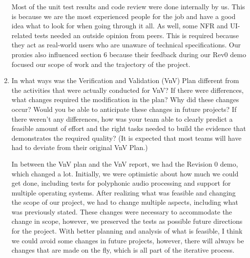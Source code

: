 \documentclass[12pt, titlepage]{article}
\begin{document}
\begin{enumerate}
  Most of the unit test results and code review were done internally by us. This is because we are the most experienced people for the job and 
  have a good idea what to look for when going through it all. As well, some NFR and UI-related tests needed an outside opinion from peers. 
  This is required because they act as real-world users who are unaware of technical specifications. Our proxies also influenced section 6 
  because their feedback during our Rev0 demo focused our scope of work and the trajectory of the project.
  

  \item In what ways was the Verification and Validation (VnV) Plan different
  from the activities that were actually conducted for VnV?  If there were
  differences, what changes required the modification in the plan?  Why did
  these changes occur?  Would you be able to anticipate these changes in future
  projects?  If there weren't any differences, how was your team able to clearly
  predict a feasible amount of effort and the right tasks needed to build the
  evidence that demonstrates the required quality?  (It is expected that most
  teams will have had to deviate from their original VnV Plan.)
  
  In between the VnV plan and the VnV report, we had the Revision 0 demo, which 
  changed a lot. Initially, we were optimistic about how much we could get done, 
  including tests for polyphonic audio processing and support for multiple operating 
  systems. After realizing what was feasible and changing the scope of our project, 
  we had to change multiple aspects, including what was previously stated. These 
  changes were necessary to accommodate the change in scope, however, we preserved 
  the tests as possible future directions for the project. With better planning and 
  analysis of what is feasible, I think we could avoid some changes in future projects, 
  however, there will always be changes that are made on the fly, which is all part of 
  the iterative process.

\end{enumerate}
\end{document}
